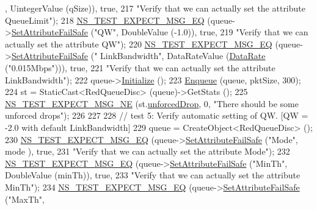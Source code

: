 \begin{DoxyCode}
      , UintegerValue (qSize)), \textcolor{keyword}{true},
217                          \textcolor{stringliteral}{"Verify that we can actually set the attribute QueueLimit"});
218   \hyperlink{group__testing_ga7304ba46a28d8cf08dfdfd6499cf7068}{NS\_TEST\_EXPECT\_MSG\_EQ} (queue->\hyperlink{classns3_1_1ObjectBase_aa7d333004e970f925a4ed5df275541b5}{SetAttributeFailSafe} (\textcolor{stringliteral}{"QW"}, 
      DoubleValue (-1.0)), \textcolor{keyword}{true},
219                          \textcolor{stringliteral}{"Verify that we can actually set the attribute QW"});
220   \hyperlink{group__testing_ga7304ba46a28d8cf08dfdfd6499cf7068}{NS\_TEST\_EXPECT\_MSG\_EQ} (queue->\hyperlink{classns3_1_1ObjectBase_aa7d333004e970f925a4ed5df275541b5}{SetAttributeFailSafe} (\textcolor{stringliteral}{"
      LinkBandwidth"}, DataRateValue (\hyperlink{classns3_1_1DataRate}{DataRate} (\textcolor{stringliteral}{"0.015Mbps"}))), \textcolor{keyword}{true},
221                          \textcolor{stringliteral}{"Verify that we can actually set the attribute LinkBandwidth"});
222   queue->\hyperlink{classns3_1_1Object_af4411cb29971772fcd09203474a95078}{Initialize} ();
223   \hyperlink{classAredQueueDiscTestCase_a5528c44233e1056913e76d5be988f049}{Enqueue} (queue, pktSize, 300);
224   st = StaticCast<RedQueueDisc> (queue)->GetStats ();
225   \hyperlink{group__testing_ga6d4b162d26b8a930115b97dd5f3d9ed9}{NS\_TEST\_EXPECT\_MSG\_NE} (st.\hyperlink{structns3_1_1RedQueueDisc_1_1Stats_a242027f6eb7d30e2cd636c52080e2c73}{unforcedDrop}, 0, \textcolor{stringliteral}{"There should be some
       unforced drops"});
226 
227 
228   \textcolor{comment}{// test 5: Verify automatic setting of QW. [QW = -2.0 with default LinkBandwidth]}
229   queue = CreateObject<RedQueueDisc> ();
230   \hyperlink{group__testing_ga7304ba46a28d8cf08dfdfd6499cf7068}{NS\_TEST\_EXPECT\_MSG\_EQ} (queue->\hyperlink{classns3_1_1ObjectBase_aa7d333004e970f925a4ed5df275541b5}{SetAttributeFailSafe} (\textcolor{stringliteral}{"Mode"}, mode
      ), \textcolor{keyword}{true},
231                          \textcolor{stringliteral}{"Verify that we can actually set the attribute Mode"});
232   \hyperlink{group__testing_ga7304ba46a28d8cf08dfdfd6499cf7068}{NS\_TEST\_EXPECT\_MSG\_EQ} (queue->\hyperlink{classns3_1_1ObjectBase_aa7d333004e970f925a4ed5df275541b5}{SetAttributeFailSafe} (\textcolor{stringliteral}{"MinTh"}, 
      DoubleValue (minTh)), \textcolor{keyword}{true},
233                          \textcolor{stringliteral}{"Verify that we can actually set the attribute MinTh"});
234   \hyperlink{group__testing_ga7304ba46a28d8cf08dfdfd6499cf7068}{NS\_TEST\_EXPECT\_MSG\_EQ} (queue->\hyperlink{classns3_1_1ObjectBase_aa7d333004e970f925a4ed5df275541b5}{SetAttributeFailSafe} (\textcolor{stringliteral}{"MaxTh"}, 

\end{DoxyCode}
